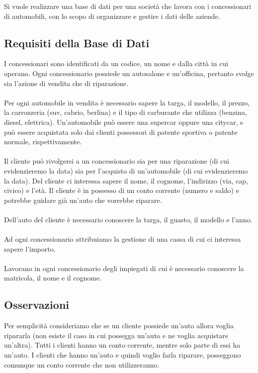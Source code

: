 \documentclass[12pt,a4paper]{article}
\begin{document}
	Si vuole realizzare una base di dati per una società che lavora con i concessionari di automobili, con lo scopo di organizzare e gestire i dati delle aziende.
	
	
\subsection{Requisiti della Base di Dati}

	I concessionari sono identificati da un codice, un nome e dalla città in cui operano. Ogni concessionario possiede un autosalone e un’officina, pertanto svolge sia l’azione di vendita che di riparazione.
	\\
	\\
	Per ogni automobile in vendita è necessario sapere la targa, il modello, il prezzo, la carrozzeria (suv, cabrio, berlina) e il tipo di carburante che utilizza (benzina, diesel, elettrica). Un’automobile può essere una supercar oppure una citycar, e può essere acquistata solo dai clienti possessori di patente sportiva o patente normale, rispettivamente. 
	\\
	\\
	Il cliente può rivolgersi a un concessionario sia per una riparazione (di cui evidenzieremo la data) sia per l’acquisto di un’automobile (di cui evidenzieremo la data). Del cliente ci interessa sapere il nome, il cognome, l’indirizzo (via, cap, civico) e l’età. Il cliente è in possesso di un conto corrente (numero e saldo) e potrebbe guidare già un’auto che vorrebbe riparare.
	\\
	\\
	Dell’auto del cliente è necessario conoscere la targa, il guasto, il modello e l’anno.
	\\
	\\
	Ad ogni concessionario attribuiamo la gestione di una cassa di cui ci interessa sapere l’importo. 
	\\
	\\
	Lavorano in ogni concessionario degli impiegati di cui è necessario conoscere la matricola, il nome e il cognome.
\pagebreak
\subsection{Osservazioni}
	Per semplicità consideriamo che se un cliente possiede un’auto allora voglia ripararla (non esiste il caso in cui possegga un’auto e ne voglia acquistare un'altra). Tutti i clienti hanno un conto corrente, mentre solo parte di essi ha un’auto. I clienti che hanno un’auto e quindi voglio farla riparare, posseggono comunque un conto corrente che non utilizzeranno.
\end{document}
